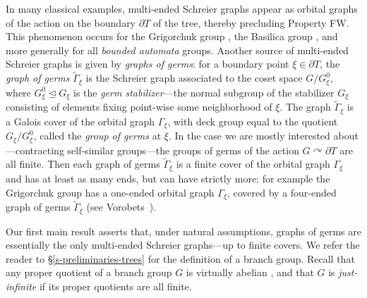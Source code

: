 \documentclass[11pt]{amsart}
\newcommand{\acts}{\ensuremath{\curvearrowright}}%
\newcommand{\Gammatilde}{\ensuremath{\widetilde{\Gamma}}}%
\theoremstyle{definition}
\theoremstyle{plain}
\newtheorem{main thm}{Theorem}
\theoremstyle{remark}
\theoremstyle{plain}
\begin{document}
In many classical examples, multi-ended Schreier graphs appear as orbital graphs of the action on the boundary $\partial T$ of the tree, thereby precluding Property FW. This phenomenon occurs for the Grigorchuk group \cite{Grigorchuk:Schreier}, the Basilica group \cite{Basilica:Schreier}, and more generally for all \emph{bounded automata} groups. Another source of multi-ended Schreier graphs is given by \emph{graphs of germs}: for a boundary point $\xi \in \partial T$, the \emph{graph of germs} $\widetilde{\Gamma}_\xi$ is the Schreier graph associated to the coset space $G/G^0_\xi$, where $G^0_\xi \trianglelefteq G_\xi$ is the \emph{germ stabilizer}---the normal subgroup of the stabilizer $G_\xi$ consisting of elements fixing point-wise some neighborhood of $\xi$. The graph $\widetilde{\Gamma}_\xi$ is a Galois cover of the orbital graph $\Gamma_\xi$, with deck group equal to the quotient $G_\xi/G^0_\xi$, called the \emph{group of germs} at $\xi$.  In the case we are mostly interested about---contracting self-similar groups---the groups of germs of the action $G\acts \partial T$ are all {finite}.  Then each graph of germs $\Gammatilde_\xi$ is a finite cover of the orbital graph $\Gamma_\xi$ and has at least as many ends, but can have strictly more: for example the Grigorchuk group has a one-ended orbital graph $\Gamma_\xi$, covered by a four-ended graph of germs $\Gammatilde_\xi$ (see Vorobets~\cite{Vorobets}).


Our first main result asserts that, under natural assumptions, graphs of germs are essentially the only multi-ended Schreier graphs---up to finite covers. We refer the reader to \S\ref{s-preliminaries-trees} for the definition of a branch group. Recall that any proper quotient of a branch group $G$ is virtually abelian \cite{Gri-branch}, and that $G$ is \emph{just-infinite} if its proper quotients are all finite.
\end{document}
